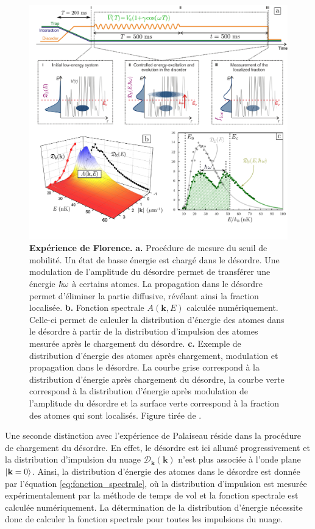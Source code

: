 \begin{figure}
\centering
\includegraphics[width=\textwidth]{Fig/Localisation/experience_florence.pdf}
\caption{\textbf{Expérience de Florence.} \textbf{a.} Procédure de mesure du seuil de mobilité. Un état de basse énergie est chargé dans le désordre. Une modulation de l'amplitude du désordre permet de transférer une énergie $\hslash \omega$ à certains atomes. La propagation dans le désordre permet d'éliminer la partie diffusive, révélant ainsi la fraction localisée. \textbf{b.} Fonction spectrale $A(\mathbf{k},E)$ calculée numériquement. Celle-ci permet de calculer la distribution d'énergie des atomes dans le désordre à partir de la distribution d'impulsion des atomes mesurée après le chargement du désordre. \textbf{c.} Exemple de distribution d'énergie des atomes après chargement, modulation et propagation dans le désordre. La courbe grise correspond à la distribution d'énergie après chargement du désordre, la courbe verte correspond à la distribution d'énergie après modulation de l'amplitude du désordre et la surface verte correspond à la fraction des atomes qui sont localisés. Figure tirée de \citep{denechaud2018vers}.}
\label{fig:experience_florence}
\end{figure}

Une seconde distinction avec l'expérience de Palaiseau réside dans la procédure de chargement du désordre. En effet, le désordre est ici allumé progressivement et la distribution d'impulsion du nuage $\mathcal{D}_{\mathbf{k}}(\mathbf{k})$ n'est plus associée à l'onde plane $\left| \mathbf{k}=0 \right\rangle$. Ainsi, la distribution d'énergie des atomes dans le désordre est donnée par l'équation \ref{eq:fonction_spectrale}, où la distribution d'impulsion est mesurée expérimentalement par la méthode de temps de vol et la fonction spectrale est calculée numériquement. La détermination de la distribution d'énergie nécessite donc de calculer la fonction spectrale pour toutes les impulsions du nuage.

